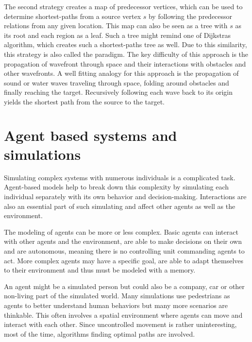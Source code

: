 		The second strategy creates a map of predecessor vertices, which can be used to determine shortest-paths from a source vertex $s$ by following the predecessor relations from any given location.
		This map can also be seen as a tree with $s$ as its root and each region as a leaf.
		Such a tree might remind one of Dijkstras algorithm, which creates such a shortest-paths tree as well.
		Due to this similarity, this strategy is also called the  paradigm\cite[648]{mitchell-discrete-geodesic}.
		The key difficulty of this approach is the propagation of wavefront through space and their interactions with obstacles and other wavefronts\cite[3]{hershberger-suri}.
		A well fitting analogy for this approach is the propagation of sound or water waves traveling through space, folding around obstacles and finally reaching the target.
		Recursively following each wave back to its origin yields the shortest path from the source to the target.

\section{Agent based systems and simulations}

	Simulating complex systems with numerous individuals is a complicated task.
	Agent-based models help to break down this complexity by simulating each individual separately with its own behavior and decision-making. \cite{macal2014introductory}
	Interactions are also an essential part of such simulating and affect other agents as well as the environment.
	
	The modeling of agents can be more or less complex.
	Basic agents can interact with other agents and the environment, are able to make decisions on their own and are autonomous, meaning there is no controlling unit commanding agents to act.
	More complex agents may have a specific goal, are able to adapt themselves to their environment and thus must be modeled with a memory.
	
	An agent might be a simulated person but could also be a company, car or other non-living part of the simulated world.
	Many simulations use pedestrians as agents to better understand human behaviors but many more scenarios are thinkable\cite[8]{macal2014introductory}.
	This often involves a spatial environment where agents can move and interact with each other.
	Since uncontrolled movement is rather uninteresting, most of the time, algorithms finding optimal paths are involved\cite{kneidl-borrmann-hartmann-navigation,gloor-hybrid-pedestrian-routing,teknomo-millonig-routing}.
	
